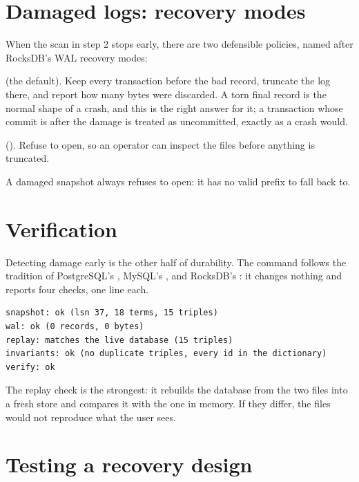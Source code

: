 \section{Damaged logs: recovery modes}

When the scan in step 2 stops early, there are two defensible policies, named
after RocksDB's WAL recovery modes:

\begin{description}[leftmargin=1.2em]
\item[Point in time] (the default). Keep every transaction before the bad record, truncate the log there, and report how many bytes were discarded. A torn final record is the normal shape of a crash, and this is the right answer for it; a transaction whose commit is after the damage is treated as uncommitted, exactly as a crash would.
\item[Absolute consistency] (). Refuse to open, so an operator can inspect the files before anything is truncated.
\end{description}

A damaged snapshot always refuses to open: it has no valid prefix to fall back
to.

\section{Verification}

Detecting damage early is the other half of durability. The  command follows the tradition of PostgreSQL's ,
MySQL's , and RocksDB's : it changes
nothing and reports four checks, one line each.

\begin{lstlisting}
snapshot: ok (lsn 37, 18 terms, 15 triples)
wal: ok (0 records, 0 bytes)
replay: matches the live database (15 triples)
invariants: ok (no duplicate triples, every id in the dictionary)
verify: ok
\end{lstlisting}

The replay check is the strongest: it rebuilds the database from the two files
into a fresh store and compares it with the one in memory. If they differ, the
files would not reproduce what the user sees.

\section{Testing a recovery design}


